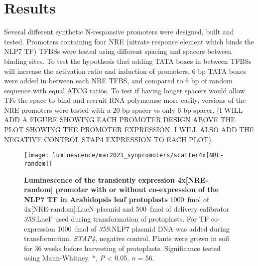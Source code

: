 \documentclass[../main.tex]{subfiles}
\begin{document}
\section{Results}\label{chapter5:results}

Several different synthetic N\hyp{}responsive promoters were designed, built and tested.
Promoters containing four NRE (nitrate response element which binds the NLP7 TF) TFBSs were tested using different spacing and spacers between binding sites.
To test the hypothesis that adding TATA boxes in between TFBSs will increase the activation ratio and induction of promoters, 6 bp TATA boxes were added in between each NRE TFBS, and compared to 6 bp of random sequence with equal ATCG ratios.
To test if having longer spacers would allow TFs the space to bind and recruit RNA polymerase more easily, versions of the NRE promoters were tested with a 20 bp spacer vs only 6 bp spacer.
(I WILL ADD A FIGURE SHOWING EACH PROMOTER DESIGN ABOVE THE PLOT SHOWING THE PROMOTER EXPRESSION. I WILL ALSO ADD THE NEGATIVE CONTROL STAP4 EXPRESSION TO EACH PLOT).
\begin{figure}[hbt!]
	\begin{center}
		\capstart
		\texttt{[image: luminescence/mar2021\_synpromoters/scatter4x[NRE-random]]}
		\caption{
			\textbf{Luminescence of the transiently expression 4x[NRE-random] promoter with or without co\hyp{}expression of the NLP7 TF in Arabidopsis leaf protoplasts}
			\SI{1000}{\fmol} of 4x[NRE-random]:LucN plasmid and \SI{500}{\fmol} of delivery calibrator \textit{35S}:LucF used during transformation of protoplasts.
			For TF co\hyp{}
			expression \SI{1000}{\fmol} of \textit{35S}:NLP7 plasmid DNA was added during transformation.
			\textit{STAP4}, negative control.
			Plants were grown in soil for 3\textendash{}6 weeks before harvesting of protoplasts.
			Significance tested using Mann-Whitney.
			*, \textit{P} \textless{} 0.05.
			\textit{n} = 5\textendash{}6.
			\label{fig:4xnre-random}
		}
	\end{center}
\end{figure}
\end{document}

